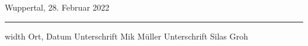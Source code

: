 \documentclass[ngerman]{article}
\begin{document}
    \vspace{2cm}
    \noindent Wuppertal, 28. Februar 2022
    \vspace{10pt}
    \hrule width \textwidth \relax
    \vspace{.35cm}
    \noindent Ort, Datum \hspace{4cm} Unterschrift {\small Mik Müller} \hspace{2cm} Unterschrift {\small Silas Groh}
\end{document}
